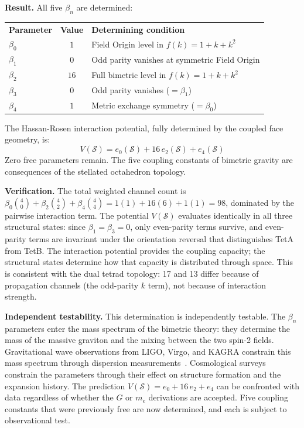 \documentclass[aps,prd,preprint,superscriptaddress,showpacs,preprintnumbers,amsmath,amssymb,nofootinbib]{revtex4-2}
\begin{document}
\textbf{Result.} All five $\beta_n$ are determined:
\begin{center}
\renewcommand{\arraystretch}{1.3}
\begin{tabular}{@{}lcl@{}}
\textbf{Parameter} & \textbf{Value} & \textbf{Determining condition} \\[2pt]
$\beta_0$ & $1$ & Field Origin level in $f(k) = 1 + k + k^2$ \\
$\beta_1$ & $0$ & Odd parity vanishes at symmetric Field Origin \\
$\beta_2$ & $16$ & Full bimetric level in $f(k) = 1 + k + k^2$ \\
$\beta_3$ & $0$ & Odd parity vanishes ($= \beta_1$) \\
$\beta_4$ & $1$ & Metric exchange symmetry ($= \beta_0$) \\
\end{tabular}
\end{center}

The Hassan-Rosen interaction potential, fully determined by the coupled face geometry, is:
\begin{equation}
V(\mathcal{S}) = e_0(\mathcal{S}) + 16\,e_2(\mathcal{S}) + e_4(\mathcal{S})
\label{eq:V-determined}
\end{equation}
Zero free parameters remain. The five coupling constants of bimetric gravity are consequences of the stellated octahedron topology.

\textbf{Verification.} The total weighted channel count is $\beta_0\binom{4}{0} + \beta_2\binom{4}{2} + \beta_4\binom{4}{4} = 1(1) + 16(6) + 1(1) = 98$, dominated by the pairwise interaction term. The potential $V(\mathcal{S})$ evaluates identically in all three structural states: since $\beta_1 = \beta_3 = 0$, only even-parity terms survive, and even-parity terms are invariant under the orientation reversal that distinguishes TetA from TetB. The interaction potential provides the coupling capacity; the structural states determine how that capacity is distributed through space. This is consistent with the dual tetrad topology: 17 and 13 differ because of propagation channels (the odd-parity $k$ term), not because of interaction strength.

\textbf{Independent testability.} This determination is independently testable. The $\beta_n$ parameters enter the mass spectrum of the bimetric theory: they determine the mass of the massive graviton and the mixing between the two spin-2 fields. Gravitational wave observations from LIGO, Virgo, and KAGRA constrain this mass spectrum through dispersion measurements~\cite{gw170817}. Cosmological surveys constrain the parameters through their effect on structure formation and the expansion history. The prediction $V(\mathcal{S}) = e_0 + 16\,e_2 + e_4$ can be confronted with data regardless of whether the $G$ or $m_e$ derivations are accepted. Five coupling constants that were previously free are now determined, and each is subject to observational test.
\end{document}
